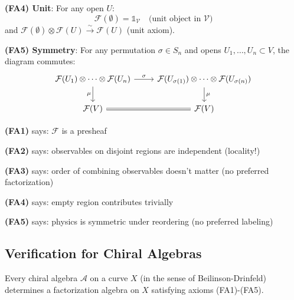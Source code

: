 \begin{definition}
\textbf{(FA4) Unit}: For any open $U$:
$$\mathcal{F}(\emptyset) = \mathbb{1}_{\mathcal{V}} 
   \quad \text{(unit object in } \mathcal{V}\text{)}$$
and $\mathcal{F}(\emptyset) \otimes \mathcal{F}(U) \xrightarrow{\sim} \mathcal{F}(U)$ 
(unit axiom).

\textbf{(FA5) Symmetry}: For any permutation $\sigma \in S_n$ and opens 
$U_1, \ldots, U_n \subset V$, the diagram commutes:
$$\begin{tikzcd}
\mathcal{F}(U_1) \otimes \cdots \otimes \mathcal{F}(U_n) 
   \arrow[r, "\sigma"] \arrow[d, "\mu"'] &
\mathcal{F}(U_{\sigma(1)}) \otimes \cdots \otimes \mathcal{F}(U_{\sigma(n)}) 
   \arrow[d, "\mu"] \\
\mathcal{F}(V) \arrow[r, equal] & \mathcal{F}(V)
\end{tikzcd}$$
\end{definition}

\begin{remark}
\textbf{(FA1)} says: $\mathcal{F}$ is a presheaf

\textbf{(FA2)} says: observables on disjoint regions are independent (locality!)

\textbf{(FA3)} says: order of combining observables doesn't matter (no preferred 
factorization)

\textbf{(FA4)} says: empty region contributes trivially

\textbf{(FA5)} says: physics is symmetric under reordering (no preferred labeling)
\end{remark}

\subsection{Verification for Chiral Algebras}

\begin{theorem}
\label{thm:chiral-factorization}
Every chiral algebra $\mathcal{A}$ on a curve $X$ (in the sense of Beilinson-Drinfeld) 
determines a factorization algebra on $X$ satisfying axioms (FA1)-(FA5).
\end{theorem}


